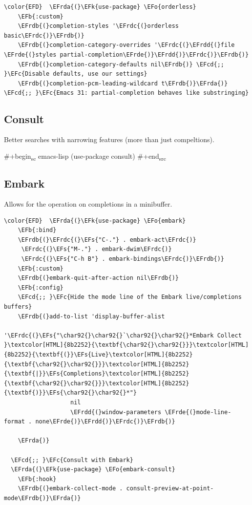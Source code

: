 \documentclass[11pt]{article}
\newcommand{\EFc}[1]{\textcolor{EFc}{#1}} %
\newcommand{\EFcd}[1]{\textcolor{EFcd}{#1}} %
\newcommand{\EFs}[1]{\textcolor{EFs}{#1}} %
\newcommand{\EFk}[1]{\textcolor{EFk}{#1}} %
\newcommand{\EFb}[1]{\textcolor{EFb}{#1}} %
\newcommand{\EFo}[1]{\textcolor{EFo}{#1}} %
\newcommand{\EFrda}[1]{\textcolor{EFrda}{#1}} %
\newcommand{\EFrdb}[1]{\textcolor{EFrdb}{#1}} %
\newcommand{\EFrdc}[1]{\textcolor{EFrdc}{#1}} %
\newcommand{\EFrdd}[1]{\textcolor{EFrdd}{#1}} %
\newcommand{\EFrde}[1]{\textcolor{EFrde}{#1}} %
\begin{document}
\begin{Code}
\begin{Verbatim}
\color{EFD}  \EFrda{(}\EFk{use-package} \EFo{orderless}
    \EFb{:custom}
    \EFrdb{(}completion-styles '\EFrdc{(}orderless basic\EFrdc{)}\EFrdb{)}
    \EFrdb{(}completion-category-overrides '\EFrdc{(}\EFrdd{(}file \EFrde{(}styles partial-completion\EFrde{)}\EFrdd{)}\EFrdc{)}\EFrdb{)}
    \EFrdb{(}completion-category-defaults nil\EFrdb{)} \EFcd{;; }\EFc{Disable defaults, use our settings}
    \EFrdb{(}completion-pcm-leading-wildcard t\EFrdb{)}\EFrda{)} \EFcd{;; }\EFc{Emacs 31: partial-completion behaves like substringing}
\end{Verbatim}
\end{Code}

\subsection{Consult}
\label{sec:org161abb8}
Better searches with narrowing features (more than just compeltions).

\#+begin\textsubscript{sc} emacs-lisp
  (use-package consult)
\#+end\textsubscript{src}

\subsection{Embark}
\label{sec:orgc009e46}
Allows for the operation on completions in a minibuffer.

\begin{Code}
\begin{Verbatim}
\color{EFD}  \EFrda{(}\EFk{use-package} \EFo{embark}
    \EFb{:bind}
    \EFrdb{(}\EFrdc{(}\EFs{"C-."} . embark-act\EFrdc{)}
     \EFrdc{(}\EFs{"M-."} . embark-dwim\EFrdc{)}
     \EFrdc{(}\EFs{"C-h B"} . embark-bindings\EFrdc{)}\EFrdb{)}
    \EFb{:custom}
    \EFrdb{(}embark-quit-after-action nil\EFrdb{)}
    \EFb{:config}
    \EFcd{;; }\EFc{Hide the mode line of the Embark live/completions buffers}
    \EFrdb{(}add-to-list 'display-buffer-alist
                 '\EFrdc{(}\EFs{"\char92{}\char92{}`\char92{}\char92{}*Embark Collect }\textcolor[HTML]{8b2252}{\textbf{\char92{}\char92{}}}\textcolor[HTML]{8b2252}{\textbf{(}}\EFs{Live}\textcolor[HTML]{8b2252}{\textbf{\char92{}\char92{}}}\textcolor[HTML]{8b2252}{\textbf{|}}\EFs{Completions}\textcolor[HTML]{8b2252}{\textbf{\char92{}\char92{}}}\textcolor[HTML]{8b2252}{\textbf{)}}\EFs{\char92{}\char92{}*"}
                   nil
                   \EFrdd{(}window-parameters \EFrde{(}mode-line-format . none\EFrde{)}\EFrdd{)}\EFrdc{)}\EFrdb{)}

    \EFrda{)}

  \EFcd{;; }\EFc{Consult with Embark}
  \EFrda{(}\EFk{use-package} \EFo{embark-consult}
    \EFb{:hook}
    \EFrdb{(}embark-collect-mode . consult-preview-at-point-mode\EFrdb{)}\EFrda{)}
\end{Verbatim}
\end{Code}
\end{document}
